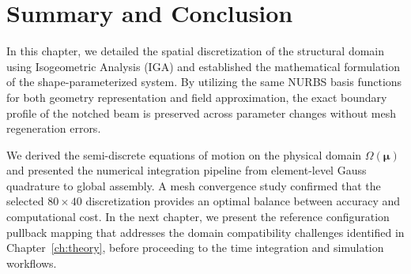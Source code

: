 \begin{table}[htbp]
    \centering
    \caption{Linear solution accuracy validation comparing full-order IGA degrees of freedom against fine-mesh Lagrangian FEM frameworks.}
    \label{tab:linear_validation}
\end{table}

\newpage

\section{Summary and Conclusion}
In this chapter, we detailed the spatial discretization of the structural domain using Isogeometric Analysis (IGA) and established the mathematical formulation of the shape-parameterized system. By utilizing the same NURBS basis functions for both geometry representation and field approximation, the exact boundary profile of the notched beam is preserved across parameter changes without mesh regeneration errors.

We derived the semi-discrete equations of motion on the physical domain $\Omega(\boldsymbol{\mu})$ and presented the numerical integration pipeline from element-level Gauss quadrature to global assembly. A mesh convergence study confirmed that the selected $80 \times 40$ discretization provides an optimal balance between accuracy and computational cost. In the next chapter, we present the reference configuration pullback mapping that addresses the domain compatibility challenges identified in Chapter~\ref{ch:theory}, before proceeding to the time integration and simulation workflows.

